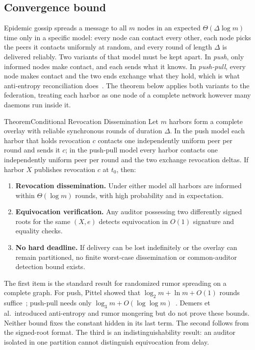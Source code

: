 \documentclass[11pt,a4paper]{article}
\theoremstyle{definition}
\theoremstyle{remark}
\begin{document}
\subsection{Convergence bound}\label{sec:fh-conv-bound}

Epidemic gossip spreads a message to all $m$ nodes in an expected $\Theta(\Delta \log m)$ time only in a specific model: every node can contact every other, each node picks the peers it contacts uniformly at random, and every round of length $\Delta$ is delivered reliably. Two variants of that model must be kept apart. In \emph{push}, only informed nodes make contact, and each sends what it knows. In \emph{push-pull}, every node makes contact and the two ends exchange what they hold, which is what anti-entropy reconciliation does~. The theorem below applies both variants to the federation, treating each harbor as one node of a complete network however many daemons run inside it.

\begin{pdclaim}{Theorem}{Conditional Revocation Dissemination}
\setlength{\parskip}{4pt plus 1pt}
\label{thm:fh-conv}
Let $m$ harbors form a complete overlay with reliable synchronous rounds of duration $\Delta$. In the push model each harbor that holds revocation $c$ contacts one independently uniform peer per round and sends it $c$; in the push-pull model every harbor contacts one independently uniform peer per round and the two exchange revocation deltas. If harbor $X$ publishes revocation $c$ at $t_0$, then:
\begin{enumerate}[nosep]
\item \textbf{Revocation dissemination.} Under either model all harbors are informed within $\Theta(\log m)$ rounds, with high probability and in expectation.
\item \textbf{Equivocation verification.} Any auditor possessing two differently signed roots for the same $(X,e)$ detects equivocation in $O(1)$ signature and equality checks.
\item \textbf{No hard deadline.} If delivery can be lost indefinitely or the overlay can remain partitioned, no finite worst-case dissemination or common-auditor detection bound exists.
\end{enumerate}
\end{pdclaim}

The first item is the standard result for randomized rumor spreading on a complete graph. For push, Pittel showed that $\log_2 m+\ln m+O(1)$ rounds suffice~; push-pull needs only $\log_3 m+O(\log\log m)$~. Demers et al.\ introduced anti-entropy and rumor mongering but do not prove these bounds. Neither bound fixes the constant hidden in its last term. The second follows from the signed-root format. The third is an indistinguishability result: an auditor isolated in one partition cannot distinguish equivocation from delay.
\end{document}
